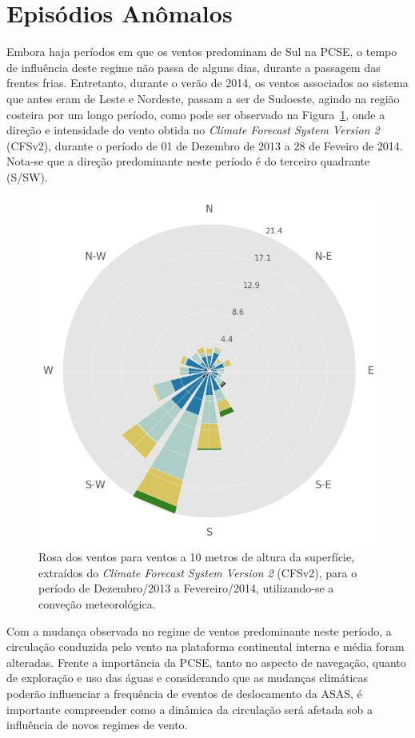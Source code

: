\section{Episódios Anômalos}
\label{sec:anomamlousEpisodes}

\hspace{5mm} 

\hspace{5mm} Embora haja períodos em que os ventos predominam de Sul na PCSE, o tempo de
influência deste regime não passa de alguns dias, durante a passagem das frentes frias.
Entretanto, durante o verão de 2014, os ventos associados ao sistema que antes eram de Leste e
Nordeste, passam a ser de Sudoeste, agindo na região costeira por um longo período, como
pode ser observado na Figura~\ref{fig:a701}, onde a direção e intensidade do vento
obtida no \textit{Climate Forecast System Version 2} (CFSv2), durante o período de
01 de Dezembro de 2013 a 28 de Feveiro de 2014. Nota-se que a direção
predominante neste período é do terceiro quadrante (S/SW).

\begin{figure}[!h]
    \centering
    \includegraphics[width=0.65\linewidth]{figuras/windrose_2014CFSv2.png}
\caption[Rosa dos Ventos para Dezembro/2013 a Fevereiro/2014]{Rosa dos ventos para ventos a 10 metros de altura da superfície, extraídos do \textit{Climate Forecast System Version 2} (CFSv2), para o período de Dezembro/2013 a Fevereiro/2014, utilizando-se a conveção meteorológica.}
    \label{fig:a701}
\end{figure}

\hspace{5mm} Com a mudança observada no regime de ventos predominante neste período, a circulação conduzida pelo vento
na plataforma continental interna e média foram alteradas. 
Frente a importância da PCSE, tanto no aspecto de navegação, quanto de
exploração e uso das águas e considerando que as mudanças climáticas poderão
influenciar a frequência de eventos de deslocamento da ASAS, é importante compreender
como a dinâmica da circulação será afetada sob a influência de novos regimes
de vento.

